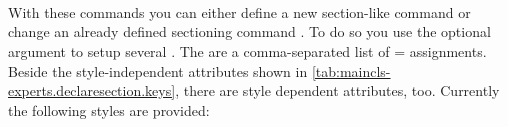 \begin{Declaration}
  \\
  \\
  \\
\end{Declaration}
%
%
%
%
With these commands you can either define a new section-like
command  or change an already defined sectioning command
. To do so you use the optional argument to setup several
. The  are a comma-separated list of
= assignments. Beside the style-independent attributes
shown in \autoref{tab:maincls-experts.declaresection.keys}, there are style
dependent attributes, too. Currently the following styles are provided:
